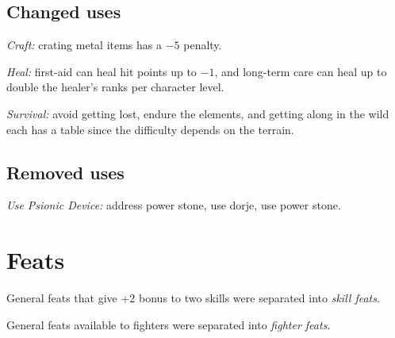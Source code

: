 \subsection{Changed uses}
\begin{itemize*}
\item \textit{Craft:} crating metal items has a $-5$ penalty.
\item \textit{Heal:} first-aid can heal hit points up to $-1$, and long-term care can heal up to double the healer's ranks per character level.
\item \textit{Survival:} avoid getting lost, endure the elements, and getting along in the wild each has a table since the difficulty depends on the terrain.
\end{itemize*}

\subsection{Removed uses}
\begin{itemize*}
\item \textit{Use Psionic Device:} address power stone, use dorje, use power stone.
\end{itemize*}

\section{Feats}
\begin{itemize*}
\item General feats that give +2 bonus to two skills were separated into \textit{skill feats}.
\item General feats available to fighters were separated into \textit{fighter feats}.
\end{itemize*}

